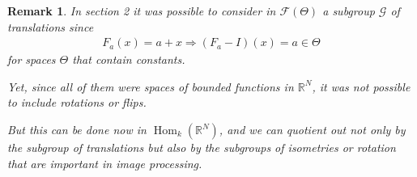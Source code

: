 \documentclass{book}
\numberwithin{equation}{section}
\newtheorem{remark}{Remark}[section]
\begin{document}
\begin{enumerate}
    \begin{remark}
        In section 2 it was possible to consider in $\mathcal{F}(\Theta)$ a subgroup $\mathcal{G}$ of translations since
        \begin{align*}
            F_a(x) = a + x\Rightarrow (F_a - I)(x) = a\in\Theta
        \end{align*}
        for spaces $\Theta$ that contain constants.
        
        Yet, since all of them were spaces of bounded functions in $\mathbb{R}^N$, it was not possible to include rotations or flips.
        
        But this can be done now in $\operatorname{Hom}_k(\mathbb{R}^N)$, and we can quotient out not only by the subgroup of translations but also by the subgroups of isometries or rotation that are important in image processing.
    \end{remark}
\end{enumerate}
\end{document}
